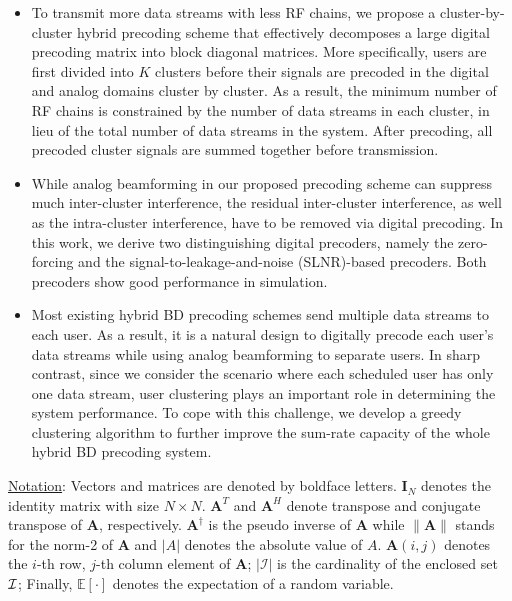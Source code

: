 \documentclass[conference]{IEEEtran}
\begin{document}
\begin{itemize}[leftmargin=*]
\item To transmit more data streams with less RF chains, we propose a cluster-by-cluster hybrid precoding scheme that effectively decomposes a large digital precoding matrix into block diagonal matrices. More specifically, users are first divided into $K$ clusters before their signals are precoded in the digital and analog domains cluster by cluster. As a result, the minimum number of RF chains is constrained by the number of data streams in each cluster, in lieu of the total number of data streams in the system. After precoding, all precoded cluster signals are summed together before transmission.\
\item While analog beamforming in our proposed precoding scheme can suppress much inter-cluster interference, the residual inter-cluster interference, as well as the intra-cluster interference, have to be removed via digital precoding. In this work, we derive two distinguishing digital precoders, namely the zero-forcing and the signal-to-leakage-and-noise (SLNR)-based precoders. Both precoders show good performance in simulation.
\item Most existing hybrid BD precoding schemes send multiple data streams to each user. As a result, it is a natural design to digitally precode each user's data streams while using analog beamforming to separate users. In sharp contrast, since we consider the scenario where each scheduled user has only one data stream, user clustering plays an important role in determining the system performance. To cope with this challenge, we develop a greedy clustering algorithm to further improve the sum-rate capacity of the whole hybrid BD precoding system.
\end{itemize}


\underline{Notation}: Vectors and matrices are denoted by boldface letters. $\bm{I}_N$ denotes the identity matrix with size $N\times N$. ${\bm A}^T$ and ${\bm A}^H$ denote transpose and conjugate transpose of ${\bm A}$, respectively. $\bm{A}^\dagger$ is the pseudo inverse of $\bm{A}$ while $\|\bm{A}\| $ stands for the norm-2 of ${\bm A}$ and $|A|$ denotes the absolute value of $A$. $\bm{A}(i,j)$ denotes the $i$-th row, $j$-th column element of ${\bm A}$; $|\mathcal{I}|$ is the cardinality of the enclosed set ${\cal I}$; Finally, $\mathbb{E}[\cdot] $ denotes the expectation of a random variable.
\end{document}
